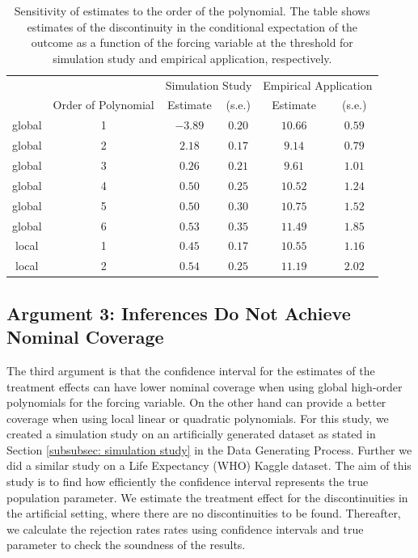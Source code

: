 \documentclass[fleqn]{article}
\begin{document}
    \begin{table}[htb]
    \centering
    \caption{Sensitivity of estimates to the order of the polynomial. The table shows estimates of the discontinuity in the conditional expectation of the outcome as a function of the forcing variable at the threshold for simulation study and empirical application, respectively.}
        \begin{tabular}{cccccc}\\
            \hline
            & & \multicolumn{2}{c}{Simulation Study} & \multicolumn{2}{c}{Empirical Application}\\
            \cline{3-6}
            & Order of Polynomial & Estimate & (s.e.) & Estimate & (s.e.)\\
            \hline
            global & 1 & $-3.89$ & $0.20$ & $10.66$ & $0.59$ \\
            global & 2 & $2.18$ & $0.17$ & $9.14$ & $0.79$ \\
            global & 3 & $0.26$ & $0.21$ & $9.61$ & $1.01$ \\
            global & 4 & $0.50$ & $0.25$ & $10.52$ & $1.24$ \\
            global & 5 & $0.50$ & $0.30$ & $10.75$ & $1.52$ \\
            global & 6 & $0.53$ & $0.35$ & $11.49$ & $1.85$ \\
            local & 1 & $0.45$ & $0.17$ & $10.55$ & $1.16$ \\
            local & 2 & $0.54$ & $0.25$ & $11.19$ & $2.02$ \\
            \hline
        \end{tabular} 
    \label{table:arg2}
    \end{table} 

    \subsection{Argument 3: Inferences Do Not Achieve Nominal Coverage}
    \label{subsec: arg3}

    The third argument is that the confidence interval for the estimates of the treatment effects can have lower nominal coverage when using global high-order polynomials for the forcing variable. On the other hand can provide a better coverage when using local linear or quadratic polynomials. For this study, we created a simulation study on an artificially generated dataset as stated in Section \ref{subsubsec: simulation study} in the Data Generating Process. Further we did a similar study on a Life Expectancy (WHO) Kaggle dataset\cite{kumar2018life}. The aim of this study is to find how efficiently the confidence interval represents the true population parameter. We estimate the treatment effect for the discontinuities in the artificial setting, where there are no discontinuities to be found. Thereafter, we calculate the rejection rates rates using confidence intervals and true parameter to check the soundness of the results. \\
\end{document}
